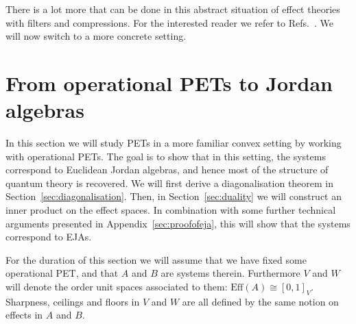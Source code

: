 \documentclass[b5paper,onecolumn,12pt,accepted=2019-05-03, issue=1, volume=1, shorttitle=papers/compositionality-1-1]{compositionalityarticle}
\DeclarePairedDelimiter{\ceil}{\lceil}{\rceil}
\numberwithin{counter}{section}
\newcommand{\pred}{\text{Eff}}
\begin{document}

\noindent There is a lot more that can be done in this abstract situation of effect theories with filters and compressions. For the interested reader we refer to Refs.~\cite{cho2015introduction,basthesis}. We will now switch to a more concrete setting.

\section{From operational PETs to Jordan algebras}\label{sec:opeffect}

In this section we will study PETs in a more familiar convex setting by working with operational PETs. The goal is to show that in this setting, the systems correspond to Euclidean Jordan algebras, and hence most of the structure of quantum theory is recovered. 
We will first derive a diagonalisation theorem in Section~\ref{sec:diagonalisation}. Then, in Section~\ref{sec:duality} we will construct an inner product on the effect spaces. In combination with some further technical arguments presented in Appendix~\ref{sec:proofofeja}, this will show that the systems correspond to EJAs.

For the duration of this section we will assume that we have fixed some operational PET, and that $A$ and $B$ are systems therein. Furthermore $V$ and $W$ will denote the order unit spaces associated to them: $\pred(A) \cong [0,1]_V$. Sharpness, ceilings and floors in $V$ and $W$ are all defined by the same notion on effects in $A$ and $B$.
\end{document}
